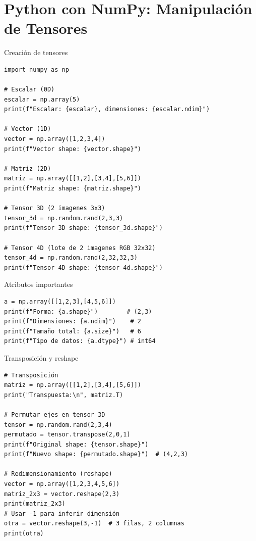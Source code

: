 \documentclass[aspectratio=169, 10pt, xcolor=table]{beamer}
\begin{document}
\section{Python con NumPy: Manipulación de Tensores}

\begin{frame}[fragile]{Creación de tensores}
    \begin{lstlisting}
import numpy as np

# Escalar (0D)
escalar = np.array(5)
print(f"Escalar: {escalar}, dimensiones: {escalar.ndim}")

# Vector (1D)
vector = np.array([1,2,3,4])
print(f"Vector shape: {vector.shape}")

# Matriz (2D)
matriz = np.array([[1,2],[3,4],[5,6]])
print(f"Matriz shape: {matriz.shape}")

# Tensor 3D (2 imagenes 3x3)
tensor_3d = np.random.rand(2,3,3)
print(f"Tensor 3D shape: {tensor_3d.shape}")

# Tensor 4D (lote de 2 imagenes RGB 32x32)
tensor_4d = np.random.rand(2,32,32,3)
print(f"Tensor 4D shape: {tensor_4d.shape}")
    \end{lstlisting}
\end{frame}

\begin{frame}[fragile]{Atributos importantes}
    \begin{lstlisting}
a = np.array([[1,2,3],[4,5,6]])
print(f"Forma: {a.shape}")        # (2,3)
print(f"Dimensiones: {a.ndim}")    # 2
print(f"Tamaño total: {a.size}")   # 6
print(f"Tipo de datos: {a.dtype}") # int64
    \end{lstlisting}
\end{frame}

\begin{frame}[fragile]{Transposición y reshape}
    \begin{lstlisting}
# Transposición
matriz = np.array([[1,2],[3,4],[5,6]])
print("Transpuesta:\n", matriz.T)

# Permutar ejes en tensor 3D
tensor = np.random.rand(2,3,4)
permutado = tensor.transpose(2,0,1)
print(f"Original shape: {tensor.shape}")
print(f"Nuevo shape: {permutado.shape}")  # (4,2,3)

# Redimensionamiento (reshape)
vector = np.array([1,2,3,4,5,6])
matriz_2x3 = vector.reshape(2,3)
print(matriz_2x3)
# Usar -1 para inferir dimensión
otra = vector.reshape(3,-1)  # 3 filas, 2 columnas
print(otra)
    \end{lstlisting}
\end{frame}
\end{document}
